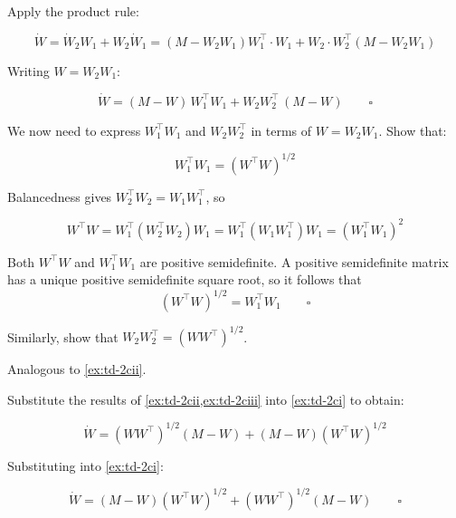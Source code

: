 \documentclass[11pt]{article}
\begin{document}
\begin{solution}[ex:td-2ci]
Apply the product rule:

\[\dot{W} = \dot{W}_2 W_1 + W_2 \dot{W}_1 = (M - W_2 W_1)W_1^\top \cdot W_1 + W_2 \cdot W_2^\top(M - W_2 W_1)\]

Writing \(W = W_2 W_1\):

\[\dot{W} = (M - W)\,W_1^\top W_1 + W_2 W_2^\top\,(M - W) \qquad \square\]
\end{solution}

\begin{exercise}
\label{ex:td-2cii}
We now need to express \(W_1^\top W_1\) and
\(W_2 W_2^\top\) in terms of \(W = W_2 W_1\). Show that:

\[W_1^\top W_1 = (W^\top W)^{1/2}\]
\end{exercise}

\begin{solution}[ex:td-2cii]
Balancedness gives \(W_2^\top W_2 = W_1 W_1^\top\), so

\[W^\top W = W_1^\top \left(W_2^\top W_2\right) W_1 = W_1^\top \left(W_1 W_1^\top\right) W_1 = \left(W_1^\top W_1\right)^2\]

Both \(W^\top W\) and \(W_1^\top W_1\) are positive semidefinite.
A positive semidefinite matrix has a unique positive semidefinite square root, so it follows that
\[(W^\top W)^{1/2} = W_1^\top W_1 \qquad \square\]
\end{solution}

\begin{exercise}
\label{ex:td-2ciii}
Similarly, show that
\(W_2 W_2^\top = (W W^\top)^{1/2}\).
\end{exercise}

\begin{solution}[ex:td-2ciii]
Analogous to \cref{ex:td-2cii}.
\end{solution}

\begin{exercise}
\label{ex:td-2civ}
Substitute the results of \cref{ex:td-2cii,ex:td-2ciii} into \cref{ex:td-2ci}
to obtain:

\[\dot{W} = (W W^\top)^{1/2}(M - W) + (M - W)(W^\top W)^{1/2}\]
\end{exercise}

\begin{solution}[ex:td-2civ]
Substituting into \cref{ex:td-2ci}:

\[\dot{W} = (M - W)(W^\top W)^{1/2} + (WW^\top)^{1/2}(M - W) \qquad \square\]
\end{solution}
\end{document}
